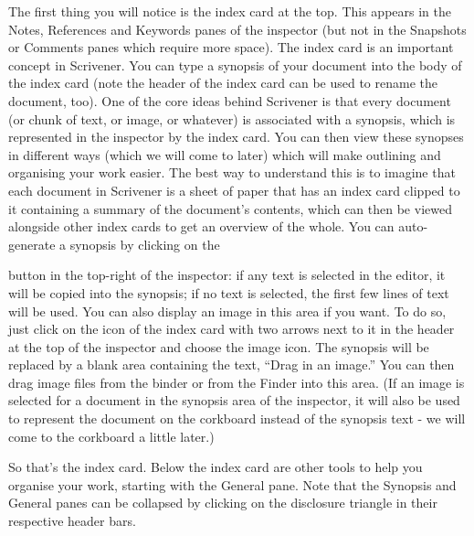\documentclass[10pt,oneside]{memoir}
\begin{document}
The first thing you will notice is the index card at the top. This appears in the Notes, References and Keywords panes of the inspector (but not in the Snapshots or Comments panes which require more space). The index card is an important concept in Scrivener. You can type a synopsis of your document into the body of the index card (note the header of the index card can be used to rename the document, too). One of the core ideas behind Scrivener is that every document (or chunk of text, or image, or whatever) is associated with a synopsis, which is represented in the inspector by the index card. You can then view these synopses in different ways (which we will come to later) which will make outlining and organising your work easier. The best way to understand this is to imagine that each document in Scrivener is a sheet of paper that has an index card clipped to it containing a summary of the document's contents, which can then be viewed alongside other index cards to get an overview of the whole.
You can auto-generate a synopsis by clicking on the \begin{figure}
\begin{center}
\end{center}
\label{tutorial-step5_theinspector.png}
\end{figure}
 button in the top-right of the inspector: if any text is selected in the editor, it will be copied into the synopsis; if no text is selected, the first few lines of text will be used.
You can also display an image in this area if you want. To do so, just click on the icon of the index card with two arrows next to it in the header at the top of the inspector and choose the image icon. The synopsis will be replaced by a blank area containing the text, ``Drag in an image.'' You can then drag image files from the binder or from the Finder into this area. (If an image is selected for a document in the synopsis area of the inspector, it will also be used to represent the document on the corkboard instead of the synopsis text - we will come to the corkboard a little later.)


So that's the index card. Below the index card are other tools to help you organise your work, starting with the General pane. Note that the Synopsis and General panes can be collapsed by clicking on the disclosure triangle in their respective header bars.
\end{document}
